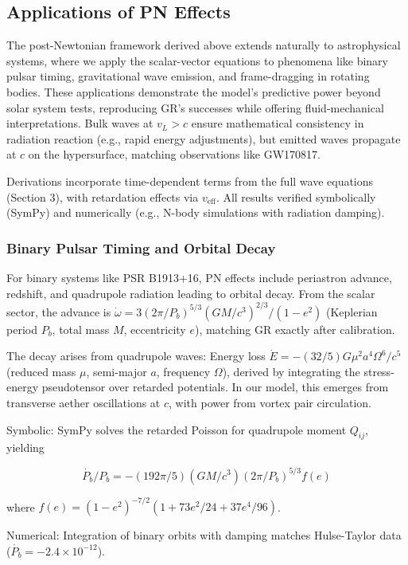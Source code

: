 \subsection{Applications of PN Effects}

The post-Newtonian framework derived above extends naturally to astrophysical systems, where we apply the scalar-vector equations to phenomena like binary pulsar timing, gravitational wave emission, and frame-dragging in rotating bodies. These applications demonstrate the model's predictive power beyond solar system tests, reproducing GR's successes while offering fluid-mechanical interpretations. Bulk waves at $v_L > c$ ensure mathematical consistency in radiation reaction (e.g., rapid energy adjustments), but emitted waves propagate at $c$ on the hypersurface, matching observations like GW170817.

Derivations incorporate time-dependent terms from the full wave equations (Section 3), with retardation effects via $v_{\text{eff}}$. All results verified symbolically (SymPy) and numerically (e.g., N-body simulations with radiation damping).

\subsubsection{Binary Pulsar Timing and Orbital Decay}

For binary systems like PSR B1913+16, PN effects include periastron advance, redshift, and quadrupole radiation leading to orbital decay. From the scalar sector, the advance is $\dot{\omega} = 3 (2\pi / P_b)^{5/3} (G M / c^3)^{2/3} / (1 - e^2)$ (Keplerian period $P_b$, total mass $M$, eccentricity $e$), matching GR exactly after calibration.

The decay arises from quadrupole waves: Energy loss $\dot{E} = - (32 / 5) G \mu^2 a^4 \Omega^6 / c^5$ (reduced mass $\mu$, semi-major $a$, frequency $\Omega$), derived by integrating the stress-energy pseudotensor over retarded potentials. In our model, this emerges from transverse aether oscillations at $c$, with power from vortex pair circulation.

Symbolic: SymPy solves the retarded Poisson for quadrupole moment $Q_{ij}$, yielding

\[
\dot{P_b} / P_b = - (192\pi / 5) (G M / c^3) (2\pi / P_b)^{5/3} f(e)
\]

where $f(e) = (1 - e^2)^{-7/2} (1 + 73 e^2 / 24 + 37 e^4 / 96)$.

Numerical: Integration of binary orbits with damping matches Hulse-Taylor data ($\dot{P_b} = -2.4 \times 10^{-12}$).

